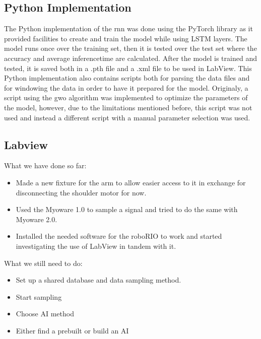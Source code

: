 \subsection{Python Implementation}
The Python implementation of the \acrshort{rnn} was done using the PyTorch library as it provided facilities 
to create and train the model while using LSTM layers. The model runs once over the training set, then it is 
tested over the test set where the accuracy and average inferencetime are calculated. After the model is trained 
and tested, it is saved both in a .pth file and a .xml file to be used in LabView.
This Python implementation also contains scripts both for parsing the data files and for windowing the data in 
order to have it prepared for the model. Originaly, a script using the \acrshort{gwo} algorithm was implemented 
to optimize the parameters of the model, however, due to the limitations mentioned before, this script was not 
used and instead a different script with a manual parameter selection was used.

\subsection{Labview}

What we have done so far: 

\begin{itemize}
    
    \item Made a new fixture for the arm to allow easier access to it in exchange for disconnecting the shoulder motor for now.
    
    \item Used the Myoware 1.0 to sample a signal and tried to do the same with Myoware 2.0.
    
    \item Installed the needed software for the roboRIO to work and started investigating the use of LabView in tandem with it.
    
\end{itemize}
What we still need to do:
\begin{itemize}    
    \item Set up a shared database and data sampling method.
    
    \item Start sampling
    
    \item Choose AI method
    
    \item Either find a prebuilt or build an AI
\end{itemize}